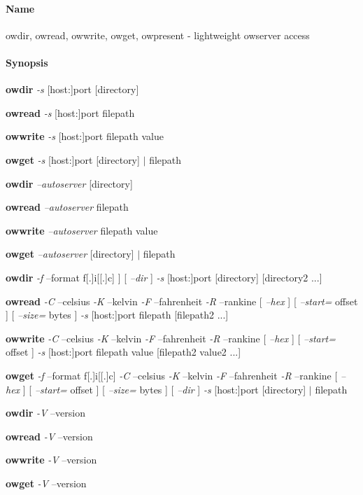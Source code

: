 \paragraph*{Name}
owdir, owread, owwrite, owget, owpresent - lightweight owserver
access 
\paragraph*{Synopsis}
\textbf{owdir} \textit{-s}  [host:]port [directory] 

\textbf{owread} \textit{-s}  [host:]port filepath 

\textbf{owwrite} \textit{-s}  [host:]port filepath value 

\textbf{owget} \textit{-s}  [host:]port [directory] $|$ filepath 



\textbf{owdir} \textit{--autoserver} [directory] 

\textbf{owread} \textit{--autoserver} filepath 

\textbf{owwrite} \textit{--autoserver} filepath value 

\textbf{owget} \textit{--autoserver} [directory] $|$ filepath 

\textbf{owdir} \textit{-f} --format f[.]i[[.]c] ] [ \textit{--dir}
] \textit{-s}  [host:]port [directory] [directory2 ...] 

\textbf{owread} \textit{-C} --celsius \textit{-K} --kelvin \textit{-F}
--fahrenheit \textit{-R} --rankine [ \textit{--hex} ] [ \textit{--start=} offset ] [ \textit{--size=} bytes ] \textit{-s}  [host:]port
filepath [filepath2 ...] 

\textbf{owwrite} \textit{-C} --celsius \textit{-K} --kelvin \textit{-F} --fahrenheit \textit{-R} --rankine [ \textit{--hex} ] [ \textit{--start=} offset
] \textit{-s}  [host:]port filepath value [filepath2 value2 ...] 

\textbf{owget} \textit{-f} --format f[.]i[[.]c]
\textit{-C} --celsius \textit{-K} --kelvin \textit{-F} --fahrenheit \textit{-R} --rankine [ \textit{--hex} ] [ \textit{--start=} offset ] [ \textit{--size=}
bytes ] [ \textit{--dir} ] \textit{-s}  [host:]port [directory] $|$ filepath 

\textbf{owdir} \textit{-V} --version 

\textbf{owread} \textit{-V} --version 

\textbf{owwrite} \textit{-V} --version 

\textbf{owget} \textit{-V} --version 



